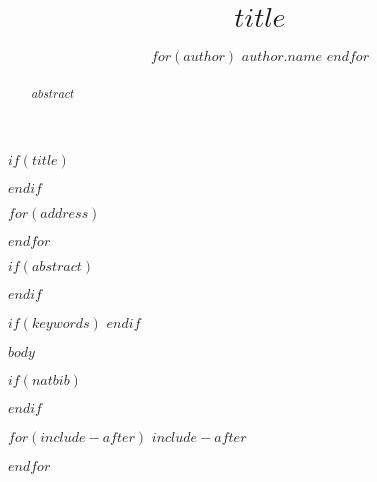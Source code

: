 \documentclass[times]{simauth}
\begin{document}

$if(title)$
\title{$title$}
$endif$

\author{$for(author)$
$author.name$ 
$endfor$}
$for(address)$
\address{ $address.address$}
$endfor$


$if(abstract)$
\begin{abstract}
$abstract$
\end{abstract}
$endif$

$if(keywords)$
$endif$

\maketitle

$body$

$if(natbib)$




$endif$

$for(include-after)$
$include-after$

$endfor$
\end{document}
